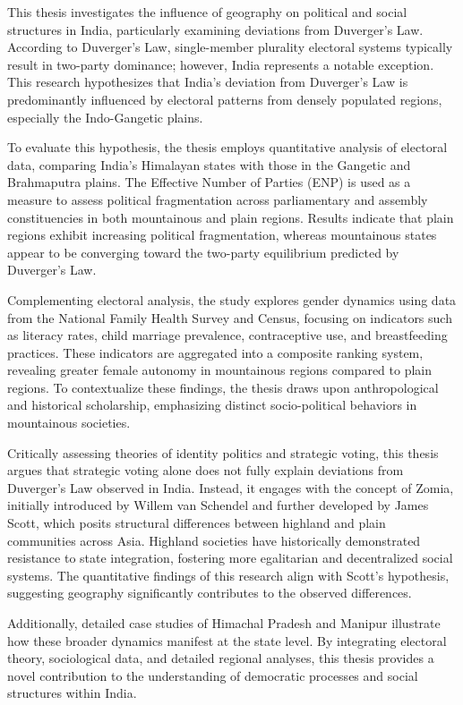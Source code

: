 This thesis investigates the influence of geography on political and social structures in India, particularly examining deviations from Duverger’s Law. According to Duverger’s Law, single-member plurality electoral systems typically result in two-party dominance; however, India represents a notable exception. This research hypothesizes that India's deviation from Duverger’s Law is predominantly influenced by electoral patterns from densely populated regions, especially the Indo-Gangetic plains.

To evaluate this hypothesis, the thesis employs quantitative analysis of electoral data, comparing India's Himalayan states with those in the Gangetic and Brahmaputra plains. The Effective Number of Parties (ENP) is used as a measure to assess political fragmentation across parliamentary and assembly constituencies in both mountainous and plain regions. Results indicate that plain regions exhibit increasing political fragmentation, whereas mountainous states appear to be converging toward the two-party equilibrium predicted by Duverger’s Law.

Complementing electoral analysis, the study explores gender dynamics using data from the National Family Health Survey and Census, focusing on indicators such as literacy rates, child marriage prevalence, contraceptive use, and breastfeeding practices. These indicators are aggregated into a composite ranking system, revealing greater female autonomy in mountainous regions compared to plain regions. To contextualize these findings, the thesis draws upon anthropological and historical scholarship, emphasizing distinct socio-political behaviors in mountainous societies.

Critically assessing theories of identity politics and strategic voting, this thesis argues that strategic voting alone does not fully explain deviations from Duverger’s Law observed in India. Instead, it engages with the concept of Zomia, initially introduced by Willem van Schendel and further developed by James Scott, which posits structural differences between highland and plain communities across Asia. Highland societies have historically demonstrated resistance to state integration, fostering more egalitarian and decentralized social systems. The quantitative findings of this research align with Scott's hypothesis, suggesting geography significantly contributes to the observed differences.

Additionally, detailed case studies of Himachal Pradesh and Manipur illustrate how these broader dynamics manifest at the state level. By integrating electoral theory, sociological data, and detailed regional analyses, this thesis provides a novel contribution to the understanding of democratic processes and social structures within India.
